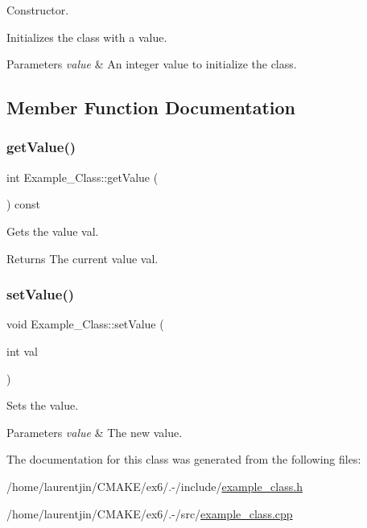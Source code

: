 Constructor. 

Initializes the class with a value. 
\begin{DoxyParams}{Parameters}
{\em value} & An integer value to initialize the class. \\
\hline
\end{DoxyParams}


\subsection{Member Function Documentation}
\mbox{\label{classExample__Class_a029eda159ecb5e6f2fbb39c549305019}} 
\subsubsection{\texorpdfstring{get\+Value()}{getValue()}}
{\footnotesize\ttfamily int Example\+\_\+\+Class\+::get\+Value (\begin{DoxyParamCaption}{ }\end{DoxyParamCaption}) const}



Gets the value val. 

\begin{DoxyReturn}{Returns}
The current value val. 
\end{DoxyReturn}
\mbox{\label{classExample__Class_a78b4cb3bc740ebbae7a263711efce0df}} 
\subsubsection{\texorpdfstring{set\+Value()}{setValue()}}
{\footnotesize\ttfamily void Example\+\_\+\+Class\+::set\+Value (\begin{DoxyParamCaption}\item[{int}]{val }\end{DoxyParamCaption})}



Sets the value. 


\begin{DoxyParams}{Parameters}
{\em value} & The new value. \\
\hline
\end{DoxyParams}


The documentation for this class was generated from the following files\+:\begin{DoxyCompactItemize}
\item 
/home/laurentjin/\+C\+M\+A\+K\+E/ex6/.-\//include/\hyperlink{example__class_8h}{example\+\_\+class.\+h}\item 
/home/laurentjin/\+C\+M\+A\+K\+E/ex6/.-\//src/\hyperlink{example__class_8cpp}{example\+\_\+class.\+cpp}\end{DoxyCompactItemize}
